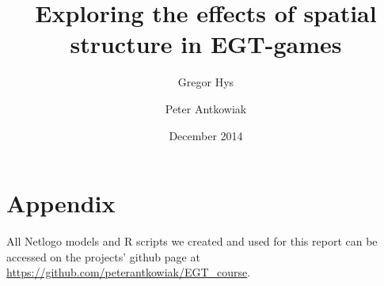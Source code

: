 \documentclass{article}
\title{Exploring the effects of spatial structure in EGT-games}
\date{December 2014}
\author{Gregor Hys \and Peter Antkowiak}
\newcommand{\HRule}{\rule{\linewidth}{0.5mm}}
\begin{document}
\maketitle


\vfill
	




\newpage

\twocolumn
\sloppy












\section*{Appendix}
All Netlogo models and R scripts we created and used for this report can be accessed on the projects' github page at \href{https://github.com/peterantkowiak/EGT_course}{https://github.com/peterantkowiak/EGT\_course}. 


\onecolumn

\newpage
\newpage



\end{document}
